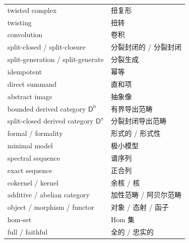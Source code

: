 {\begin{longtable}{p{}p{}}
twisted complex & 扭复形 \\
twisting & 扭转 \\
convolution & 卷积 \\
split-closed / split-closure & 分裂封闭的 / 分裂封闭 \\
split-generation / split-generate & 分裂生成 \\
idempotent & 幂等 \\
direct summand & 直和项 \\
abstract image & 抽象像 \\
bounded derived category $\mathsf{D}^{\mathrm b}$ & 有界导出范畴 \\
split-closed derived category $\mathsf{D}^\pi$ & 分裂封闭导出范畴 \\
formal / formality & 形式的 / 形式性 \\
minimal model & 极小模型 \\
spectral sequence & 谱序列 \\
exact sequence & 正合列 \\
cokernel / kernel & 余核 / 核 \\
additive / abelian category & 加性范畴 / 阿贝尔范畴 \\
object / morphism / functor & 对象 / 态射 / 函子 \\
hom-set & Hom 集 \\
full / faithful & 全的 / 忠实的 \\
\bottomrule
\end{longtable}}

